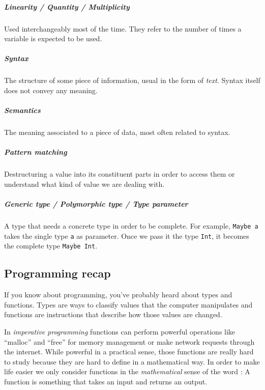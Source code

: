 \documentclass[
]{article}
\begin{document}
\hypertarget{linearity-quantity-multiplicity}{%
\subparagraph{Linearity / Quantity /
Multiplicity}\label{linearity-quantity-multiplicity}}

Used interchangeably most of the time. They refer to the number of times
a variable is expected to be used.

\hypertarget{syntax}{%
\subparagraph{Syntax}\label{syntax}}

The structure of some piece of information, usual in the form of
\emph{text}. Syntax itself does not convey any meaning.

\hypertarget{semantics}{%
\subparagraph{Semantics}\label{semantics}}

The meaning associated to a piece of data, most often related to syntax.

\hypertarget{pattern-matching}{%
\subparagraph{Pattern matching}\label{pattern-matching}}

Destructuring a value into its constituent parts in order to access them
or understand what kind of value we are dealing with.

\hypertarget{generic-type-polymorphic-type-type-parameter}{%
\subparagraph{Generic type / Polymorphic type / Type
parameter}\label{generic-type-polymorphic-type-type-parameter}}

A type that needs a concrete type in order to be complete. For example,
\texttt{Maybe\ a} takes the single type \texttt{a} as parameter. Once we
pass it the type \texttt{Int}, it becomes the complete type
\texttt{Maybe\ Int}.

\hypertarget{programming-recap}{%
\subsection{Programming recap}\label{programming-recap}}

If you know about programming, you've probably heard about types and
functions. Types are ways to classify values that the computer
manipulates and functions are instructions that describe how those
values are changed.

In \emph{imperative programming} functions can perform powerful
operations like ``malloc'' and ``free'' for memory management or make
network requests through the internet. While powerful in a practical
sense, those functions are really hard to study because they are hard to
define in a mathematical way. In order to make life easier we only
consider functions in the \emph{mathematical} sense of the word : A
function is something that takes an input and returns an output.
\end{document}
